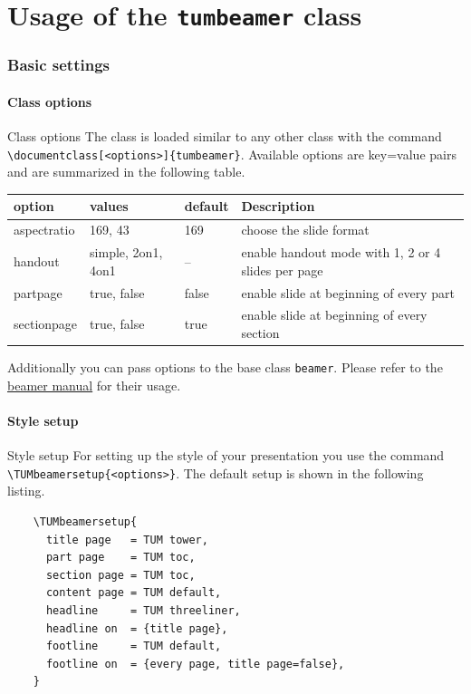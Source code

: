 \part{Usage of the \texttt{tumbeamer} class}
\section{Basic settings}
\subsection{Class options}
\begin{frame}[fragile]{Class options}
  The class is loaded similar to any other class with the command
  \lstinline|\documentclass[<options>]{tumbeamer}|. Available options
  are key=value pairs and are summarized in the following table.

  \vspace{3mm}
  \begin{tabular}{lp{2cm}ll}
    \toprule
    option      & values             & default & Description               \\
    \midrule
    aspectratio & 169, 43            & 169     & choose the slide format   \\
    handout     & simple, 2on1, 4on1 & --      & enable handout mode with
    1, 2 or 4 slides per page                                              \\
    partpage    & true, false        & false   & enable slide at beginning
    of every part                                                          \\
    sectionpage & true, false        & true    & enable slide at beginning
    of every section                                                       \\
    \bottomrule
  \end{tabular}
  \vspace{.1mm}

  Additionally you can pass options to the base class \texttt{beamer}.
  Please refer to the \href{https://ctan.org/pkg/beamer}{beamer manual}
  for their usage.
\end{frame}

\subsection{Style setup}
\begin{frame}[fragile]{Style setup}
  For setting up the style of your presentation you use the command
  \lstinline|\TUMbeamersetup{<options>}|. The default setup is shown
  in the following listing.

  \begin{lstlisting}
    \TUMbeamersetup{
      title page   = TUM tower,
      part page    = TUM toc,
      section page = TUM toc,
      content page = TUM default,
      headline     = TUM threeliner,
      headline on  = {title page},
      footline     = TUM default,
      footline on  = {every page, title page=false},
    }
  \end{lstlisting}
\end{frame}

